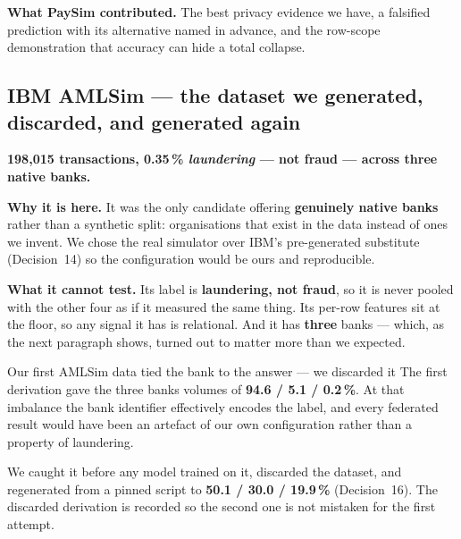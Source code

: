 \documentclass[11pt]{article}
\begin{document}
\textbf{What PaySim contributed.} The best privacy evidence we have, a falsified prediction with its
alternative named in advance, and the row-scope demonstration that accuracy can hide a total collapse.

\subsection{IBM AMLSim --- the dataset we generated, discarded, and generated again}

\textbf{198{,}015 transactions, 0.35\,\% \emph{laundering} --- not fraud --- across three native banks.}

\textbf{Why it is here.} It was the only candidate offering \textbf{genuinely native banks} rather than a
synthetic split: organisations that exist in the data instead of ones we invent. We chose the real
simulator over IBM's pre-generated substitute (Decision~14) so the configuration would be ours and
reproducible.

\textbf{What it cannot test.} Its label is \textbf{laundering, not fraud}, so it is never pooled with the
other four as if it measured the same thing. Its per-row features sit at the floor, so any signal it has
is relational. And it has \textbf{three} banks --- which, as the next paragraph shows, turned out to
matter more than we expected.

\begin{warnbox}{Our first AMLSim data tied the bank to the answer --- we discarded it}
The first derivation gave the three banks volumes of \textbf{94.6 / 5.1 / 0.2\,\%}. At that imbalance the
bank identifier effectively encodes the label, and every federated result would have been an artefact of
our own configuration rather than a property of laundering.

We caught it before any model trained on it, discarded the dataset, and regenerated from a pinned script
to \textbf{50.1 / 30.0 / 19.9\,\%} (Decision~16). The discarded derivation is recorded so the second one
is not mistaken for the first attempt.
\end{warnbox}
\end{document}
